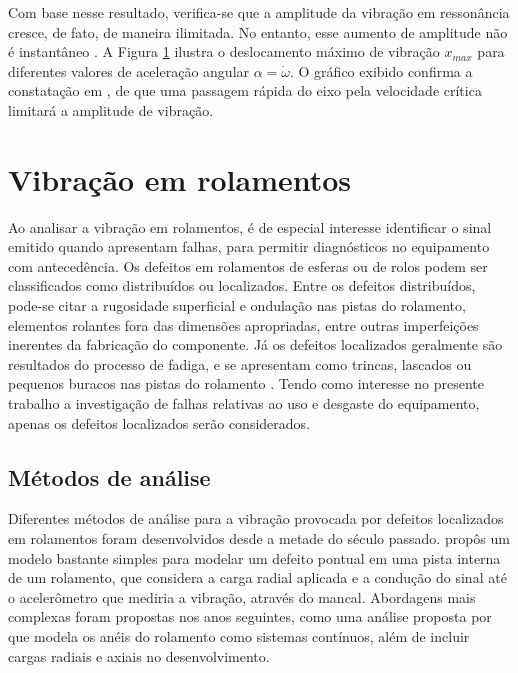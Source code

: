 \documentclass[12pt,openright,oneside,a4paper,
	chapter=TITLE,section=TITLE,
	english,brazil]{abntex2}
\begin{document}
	Com base nesse resultado, verifica-se que a amplitude da vibração em ressonância cresce, de fato, de maneira ilimitada. No entanto, esse aumento de amplitude não é instantâneo \cite{dimarogonas:1995}. A Figura \ref{fig:aceleracao-vel-critica} ilustra o deslocamento máximo de vibração $ x_{max} $ para diferentes valores de aceleração angular $ \alpha = \dot{\omega} $. O gráfico exibido confirma a constatação em \cite{rao:2008}, de que uma passagem rápida do eixo pela velocidade crítica limitará a amplitude de vibração.
	\begin{figure}
		\label{fig:aceleracao-vel-critica}
	\end{figure}

	\section{Vibração em rolamentos}
	Ao analisar a vibração em rolamentos, é de especial interesse identificar o sinal emitido quando apresentam falhas, para permitir diagnósticos no equipamento com antecedência. Os defeitos em rolamentos de esferas ou de rolos podem ser classificados como distribuídos ou localizados. Entre os defeitos distribuídos, pode-se citar a rugosidade superficial e ondulação nas pistas do rolamento, elementos rolantes fora das dimensões apropriadas, entre outras imperfeições inerentes da fabricação do componente. Já os defeitos localizados geralmente são resultados do processo de fadiga, e se apresentam como trincas, lascados ou pequenos buracos nas pistas do rolamento \cite{tandon:1997,sassi:2007}. Tendo como interesse no presente trabalho a investigação de falhas relativas ao uso e desgaste do equipamento, apenas os defeitos localizados serão considerados.
	
	\subsection{Métodos de análise}
	Diferentes métodos de análise para a vibração provocada por defeitos localizados em rolamentos foram desenvolvidos desde a metade do século passado. \citeauthor{mcfadden:1984} propôs um modelo bastante simples para modelar um defeito pontual em uma pista interna de um rolamento, que considera a carga radial aplicada e a condução do sinal até o acelerômetro que mediria a vibração, através do mancal. Abordagens mais complexas foram propostas nos anos seguintes, como uma análise proposta por \citeauthor{tandon:1997} que modela os anéis do rolamento como sistemas contínuos, além de incluir cargas radiais e axiais no desenvolvimento.
	
\end{document}
